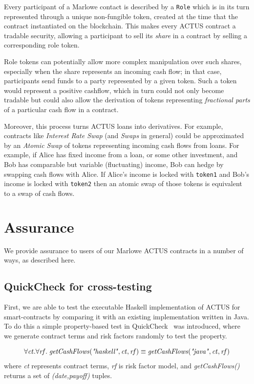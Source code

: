 \documentclass[runningheads]{llncs}
\newcommand{\ident}[1]{\mbox{\emph{#1}}}
\begin{document}
Every participant of a Marlowe contact %
is described by a \texttt{Role} which
is in its turn represented through a unique non-fungible token, created at the time that the contract instantiated on the blockchain.
This makes every ACTUS contract a tradable security, allowing a
participant to sell its \emph{share} in a contract by selling a corresponding
role token.

Role tokens can potentially allow more complex manipulation over such shares,
especially when the share represents an incoming cash flow; in that case, participants
send funds to a party represented by a given token. Such a token
would represent a positive cashflow, which in turn could not only become
tradable but could also allow the derivation of tokens representing \emph{fractional parts}
of a particular cash flow in a contract.

Moreover, this process turns ACTUS loans into derivatives. For example, contracts
like \emph{Interest Rate Swap} (and \emph{Swaps} in general) could be approximated
by an \emph{Atomic Swap} of tokens representing incoming cash flows from
loans. 
For example, if Alice has fixed income from a loan, or some other
investment, and Bob has comparable but variable (fluctuating) income,
Bob can hedge by swapping cash flows with Alice. If Alice's income
is locked with \texttt{token1} and Bob's income is locked with \texttt{token2} then an
atomic swap of those tokens is equivalent to a swap of cash flows.

\section{Assurance}
\label{assurance}

We provide assurance to users of our Marlowe ACTUS contracts in a number of ways, as described here. 

\subsection{QuickCheck for cross-testing}

First, we are able to test the executable Haskell implementation
of ACTUS for smart-contracts by comparing it with an existing implementation written in Java. To do this  
a simple property-based test in QuickCheck~\cite{qc} was introduced, where we generate contract terms and risk factors randomly to test the property.

\newcommand{\rf}{\ident{rf}}
\newcommand{\ct}{\ident{ct}}
\smallskip
\noindent 
\begin{equation}
\forall \ct.\forall \rf. \; \ident{getCashFlows}(\ident{"haskell"},\ct,\rf)\equiv \ident{getCashFlows}(\ident{"java"},\ct,\rf)
\end{equation}
\noindent
where \emph{ct} represents contract terms, \emph{rf} is risk factor model, and
\emph{getCashFlows()} returns a set of \emph{(date,payoff)} tuples.
\end{document}
